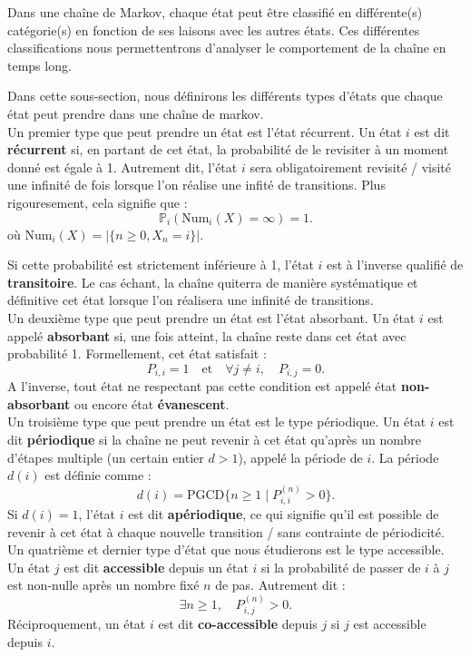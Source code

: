 \documentclass{article}
\begin{document}
Dans une chaîne de Markov, chaque état peut être classifié en différente(s) catégorie(s) en fonction de ses laisons avec les autres états. Ces différentes classifications nous permettentrons d'analyser le comportement de la chaîne en temps long.

Dans cette sous-section, nous définirons les différents types d'états que chaque état peut prendre dans une chaîne de markov. \\ %

Un premier type que peut prendre un état est l'état récurrent.
Un état $i$ est dit \textbf{récurrent} si, en partant de cet état, la probabilité de le revisiter à un moment donné est égale à 1. Autrement dit, l'état $i$ sera obligatoirement revisité / visité une infinité de fois lorsque l'on réalise une infité de transitions. Plus rigouresement, cela signifie que :
\[
\mathbb{P}_i(\text{Num}_i(X) = \infty) = 1.
\]
où \(\text{Num}_i(X) = |\{n \geq 0, X_n = i\}|\).

Si cette probabilité est strictement inférieure à 1, l'état $i$ est à l'inverse qualifié de \textbf{transitoire}. Le cas échant, la chaîne quiterra de manière systématique et définitive cet état lorsque l'on réalisera une infinité de transitions. \\

Un deuxième type que peut prendre un état est l'état absorbant.
Un état $i$ est appelé \textbf{absorbant} si, une fois atteint, la chaîne reste dans cet état avec probabilité 1. Formellement, cet état satisfait :
\[
P_{i,i} = 1 \quad \text{et} \quad \forall j \neq i, \quad P_{i,j} = 0.
\]
A l'inverse, tout état ne respectant pas cette condition est appelé état \textbf{non-absorbant} ou encore état \textbf{évanescent}. \\

Un troisième type que peut prendre un état est le type périodique.
Un état $i$ est dit \textbf{périodique} si la chaîne ne peut revenir à cet état qu'après un nombre d'étapes multiple (un certain entier $d > 1$), appelé la période de $i$. La période $d(i)$ est définie comme :
\[
d(i) = \text{PGCD}\{n \geq 1 \mid P_{i,i}^{(n)} > 0\}.
\]
Si $d(i) = 1$, l'état $i$ est dit \textbf{apériodique}, ce qui signifie qu'il est possible de revenir à cet état à chaque nouvelle transition /  sans contrainte de périodicité. \\

Un quatrième et dernier type d'état que nous étudierons est le type accessible.
Un état $j$ est dit \textbf{accessible} depuis un état $i$ si la probabilité de passer de $i$ à $j$ est non-nulle après un nombre fixé $n$ de pas. Autrement dit :
\[
\exists n \geq 1, \quad P_{i,j}^{(n)} > 0.
\]
Réciproquement, un état $i$ est dit \textbf{co-accessible} depuis $j$ si $j$ est accessible depuis $i$.
\end{document}
